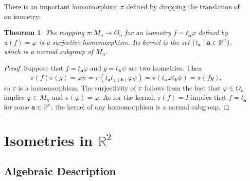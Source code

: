 \documentclass[11pt]{article}
\renewcommand{\vec}[1]{\mathbf{#1}}
\newtheorem{theorem}{Theorem}
\begin{document}
There is an important homomorphism $\pi$ defined by dropping the translation of an isometry:

\begin{adjustwidth}{1cm}{}
	\begin{theorem}
		The mapping $\pi : M_{n} \to O_{n}$ for an isometry $f = t_{\vec{a}} \varphi$ defined by $\pi(f) = \varphi$ is a surjective homomorphism. Its kernel is the set $\{ t_{\vec{a}} \mid \vec{a} \in \mathbb{R}^{n} \}$, which is a normal subgroup of $M_{n}$.
	\end{theorem}
	\begin{proof}
		Suppose that $f = t_{\vec{a}} \varphi$ and $g = t_{\vec{b}} \psi$ are two isometries. Then
		\[
			\pi(f) \pi(g) = \varphi \psi = \pi(t_{\vec{a}} t_{\varphi(\vec{b})} \varphi \psi) = \pi(t_{\vec{a}} \varphi t_{\vec{b}} \psi) = \pi(fg),
		\]
		so $\pi$ is a homomorphism. The surjectivity of $\pi$ follows from the fact that $\varphi \in O_{n}$ implies $\varphi \in M_{n}$ and $\pi(\varphi) = \varphi$. As for the kernel, $\pi(f) = I$ implies that $f = t_{\vec{a}}$ for some $\vec{a} \in \mathbb{R}^{n}$; the kernel of any homomorphism is a normal subgroup.
	\end{proof}
\end{adjustwidth}


\section{Isometries in \texorpdfstring{$\mathbb{R}^{2}$}{The Plane}}


\subsection{Algebraic Description}
\end{document}
